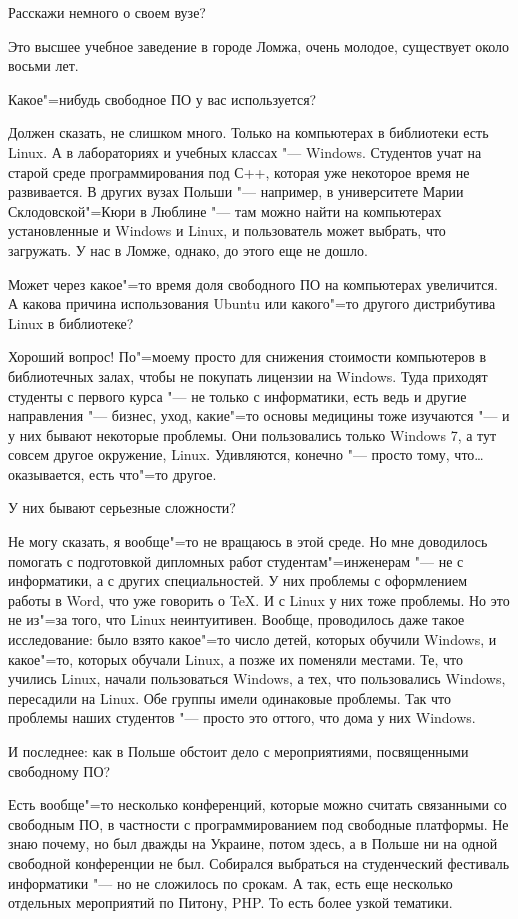 \documentclass[10pt, a5paper]{article}
\begin{document}
\q Расскажи немного о своем вузе?

\noindent Это высшее учебное заведение в городе Ломжа, очень молодое, существует около восьми лет. 

\q Какое"=нибудь свободное ПО у вас используется?

\a Должен сказать, не слишком много. Только на компьютерах в библиотеки есть Linux. А в лабораториях и учебных классах "--- Windows. Студентов учат на старой среде программирования под С++, которая уже некоторое время не развивается. В других вузах Польши "--- например, в университете Марии Склодовской"=Кюри в Люблине "--- там можно найти на компьютерах установленные и Windows и Linux, и пользователь может выбрать, что загружать. У нас в Ломже, однако, до этого еще не дошло.

\q Может через какое"=то время доля свободного ПО на компьютерах увеличится. А какова причина использования Ubuntu или какого"=то другого дистрибутива Linux в библиотеке?

\a Хороший вопрос! По"=моему просто для снижения стоимости компьютеров в библиотечных залах, чтобы не покупать лицензии на Windows. Туда приходят студенты с первого курса "--- не только с информатики, есть ведь и другие направления "--- бизнес, уход, какие"=то основы медицины тоже изучаются "--- и у них бывают некоторые проблемы. Они пользовались только Windows 7, а тут совсем другое окружение, Linux. Удивляются, конечно "--- просто тому, что\ldots оказывается, есть что"=то другое. 

\q У них бывают серьезные сложности?

\a Не могу сказать, я вообще"=то не вращаюсь в этой среде. Но мне доводилось помогать с подготовкой дипломных работ студентам"=инженерам "--- не с информатики, а с других специальностей. У них проблемы с оформлением работы в Word, что уже говорить о TeX. И с Linux у них тоже проблемы. Но это не из"=за того, что Linux неинтуитивен. Вообще, проводилось даже такое исследование: было взято какое"=то число детей, которых обучили Windows, и какое"=то, которых обучали Linux, а позже их поменяли местами. Те, что учились Linux, начали пользоваться Windows, а тех, что пользовались Windows, пересадили на Linux. Обе группы имели одинаковые проблемы. Так что проблемы наших студентов "--- просто это оттого, что дома у них Windows. 

\q И последнее: как в Польше обстоит дело с мероприятиями, посвященными свободному ПО?

\a Есть вообще"=то несколько конференций, которые можно считать связанными со свободным ПО, в частности с программированием под свободные платформы. Не знаю почему, но был дважды на Украине, потом здесь, а в Польше ни на одной свободной конференции не был. Собирался выбраться на студенческий фестиваль информатики "--- но не сложилось по срокам. А так, есть еще несколько отдельных мероприятий по Питону, PHP. То есть более узкой тематики.
\end{document}
